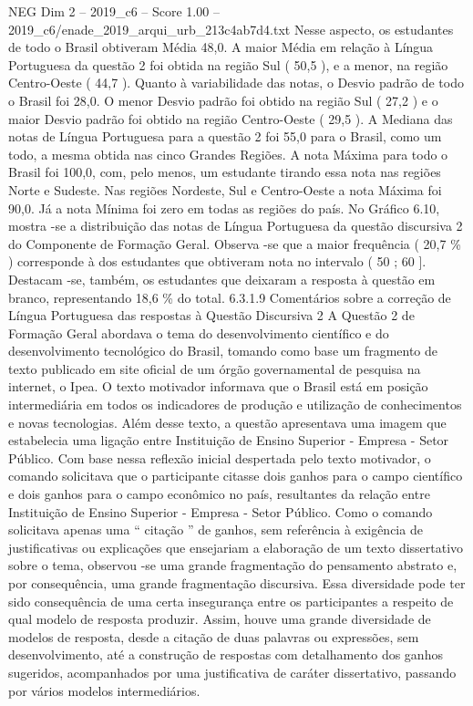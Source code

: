 \begin{textsample}{NEG Dim 2 – 2019\_c6 – Score 1.00 – 2019\_c6/enade\_2019\_arqui\_urb\_213c4ab7d4.txt}
Nesse aspecto, os estudantes de todo o Brasil obtiveram Média 48,0.
A maior Média em relação à Língua Portuguesa da questão 2 foi obtida na região Sul ( 50,5 ), e a menor, na região Centro-Oeste ( 44,7 ).
Quanto à variabilidade das notas, o Desvio padrão de todo o Brasil foi 28,0.
O menor Desvio padrão foi obtido na região Sul ( 27,2 ) e o maior Desvio padrão foi obtido na região Centro-Oeste ( 29,5 ).
A Mediana das notas de Língua Portuguesa para a questão 2 foi 55,0 para o Brasil, como um todo, a mesma obtida nas cinco Grandes Regiões.
A nota Máxima para todo o Brasil foi 100,0, com, pelo menos, um estudante tirando essa nota nas regiões Norte e Sudeste.
Nas regiões Nordeste, Sul e Centro-Oeste a nota Máxima foi 90,0.
Já a nota Mínima foi zero em todas as regiões do país.
No Gráfico 6.10, mostra -se a distribuição das notas de Língua Portuguesa da questão discursiva 2 do Componente de Formação Geral.
Observa -se que a maior frequência ( 20,7 \% ) corresponde à dos estudantes que obtiveram nota no intervalo ( 50 ; 60 ].
Destacam -se, também, os estudantes que deixaram a resposta à questão em branco, representando 18,6 \% do total. 6.3.1.9 Comentários sobre a correção de Língua Portuguesa das respostas à Questão Discursiva 2 A Questão 2 de Formação Geral abordava o tema do desenvolvimento científico e do desenvolvimento tecnológico do Brasil, tomando como base um fragmento de texto publicado em site oficial de um órgão governamental de pesquisa na internet, o Ipea.
O texto motivador informava que o Brasil está em posição intermediária em todos os indicadores de produção e utilização de conhecimentos e novas tecnologias.
Além desse texto, a questão apresentava uma imagem que estabelecia uma ligação entre Instituição de Ensino Superior - Empresa - Setor Público.
Com base nessa reflexão inicial despertada pelo texto motivador, o comando solicitava que o participante citasse dois ganhos para o campo científico e dois ganhos para o campo econômico no país, resultantes da relação entre Instituição de Ensino Superior - Empresa - Setor Público.
Como o comando solicitava apenas uma “ citação ” de ganhos, sem referência à exigência de justificativas ou explicações que ensejariam a elaboração de um texto dissertativo sobre o tema, observou -se uma grande fragmentação do pensamento abstrato e, por consequência, uma grande fragmentação discursiva.
Essa diversidade pode ter sido consequência de uma certa insegurança entre os participantes a respeito de qual modelo de resposta produzir.
Assim, houve uma grande diversidade de modelos de resposta, desde a citação de duas palavras ou expressões, sem desenvolvimento, até a construção de respostas com detalhamento dos ganhos sugeridos, acompanhados por uma justificativa de caráter dissertativo, passando por vários modelos intermediários.

\end{textsample}
